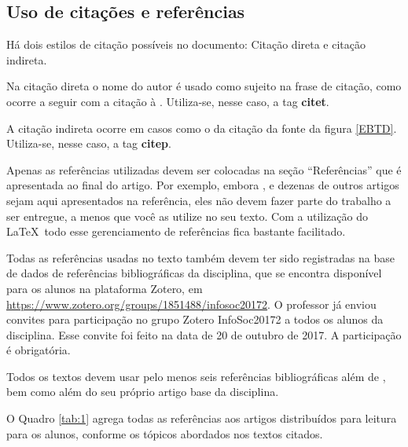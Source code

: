 \documentclass[12pt]{article}
\begin{document}
	\subsection{Uso de citações e referências}

	Há dois estilos de citação possíveis no documento: Citação direta e citação indireta.

	Na citação direta o nome do autor é usado como sujeito na frase de citação, como ocorre a seguir com a citação à \citet{gt_interministerial_port._n_842/2017_estrategia_2017}. Utiliza-se, nesse caso, a tag \textbf{citet}.

	A citação indireta ocorre em casos como o da citação da fonte da figura \ref{EBTD}. Utiliza-se, nesse caso, a tag \textbf{citep}.

	Apenas as referências utilizadas devem ser colocadas na seção ``Referências'' que é apresentada ao final do artigo.
	Por exemplo, embora \cite{adams_view_2016}, \cite{al-garadi_cybercrime_2016} e dezenas de outros artigos sejam aqui apresentados na referência,
	eles não devem fazer parte do trabalho a ser entregue, a menos que você as utilize no seu texto.
	Com a utilização do \LaTeX\ todo esse gerenciamento de referências fica bastante facilitado.

	Todas as referências usadas no texto também devem ter sido registradas na base de dados de referências bibliográficas da disciplina, que se encontra disponível para os alunos na plataforma Zotero, em \href{https://www.zotero.org/groups/1851488/infosoc20172}{https://www.zotero.org/groups/1851488/infosoc20172}. O professor já enviou convites para participação no grupo Zotero InfoSoc20172 a todos os alunos da disciplina. Esse convite foi feito na data de 20 de outubro de 2017. A participação é obrigatória.

	Todos os textos devem usar pelo menos seis referências bibliográficas além de \citep{jones_doing_2016,fernandes_organizacao_2016,vickery_information_1987}, bem como além do seu próprio artigo base da disciplina.

	O Quadro \ref{tab:1} agrega todas as referências aos artigos distribuídos para leitura para os alunos, conforme os tópicos abordados nos textos citados.
\end{document}
